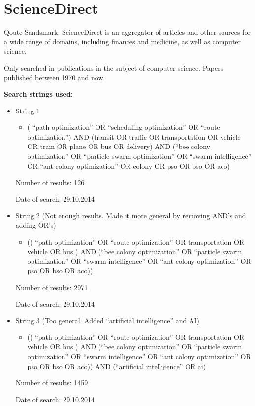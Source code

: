 \section{ScienceDirect}
Qoute Sandsmark: ScienceDirect is an aggregator of articles and other sources for a wide range of domains, including finances and medicine, as well as computer science.
\par Only searched in publications in the subject of computer science.
Papers published between 1970 and now.
\par
\textbf{Search strings used:}
\begin{itemize}
\item String 1 
\begin{itemize}
\item ( ``path optimization'' OR ``scheduling optimization'' OR ``route optimization'') AND (transit OR traffic OR transportation OR vehicle OR train OR plane OR bus OR delivery) AND (``bee colony optimization'' OR ``particle swarm optimization'' OR ``swarm intelligence'' OR ``ant colony optimization'' OR colony OR pso OR bso OR aco)
\end{itemize}
\par Number of results: 126
\par Date of search: 29.10.2014
\end{itemize}
\begin{itemize}
\item String 2 (Not enough results. Made it more general by removing AND’s and adding OR’s)
\begin{itemize}
\item (( ``path optimization'' OR ``route optimization'' OR transportation OR vehicle OR bus ) AND (``bee colony optimization'' OR ``particle swarm optimization'' OR ``swarm intelligence'' OR ``ant colony optimization'' OR pso OR bso OR aco))
\end{itemize}
\par Number of results: 2971
\par Date of search: 29.10.2014
\end{itemize}
\begin{itemize}
\item String 3 (Too general. Added ``artificial intelligence'' and AI)
\begin{itemize}
\item (( ``path optimization'' OR ``route optimization'' OR transportation OR vehicle OR bus ) AND (``bee colony optimization'' OR ``particle swarm optimization'' OR ``swarm intelligence'' OR ``ant colony optimization'' OR pso OR bso OR aco)) AND (``artificial intelligence'' OR ai)
\end{itemize}
\par Number of results: 1459
\par Date of search: 29.10.2014
\end{itemize}
